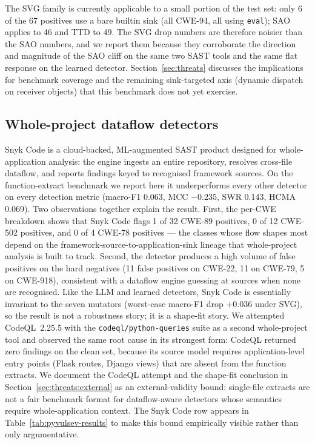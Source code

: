 The SVG family is currently applicable to a small portion of the
test set: only 6 of the 67 positives use a bare builtin sink (all
CWE-94, all using \texttt{eval}); SAO applies to 46 and TTD to 49.
The SVG drop numbers are therefore noisier than the SAO numbers,
and we report them because they corroborate the direction and
magnitude of the SAO cliff on the same two SAST tools and the same
flat response on the learned detector. Section~\ref{sec:threats}
discusses the implications for benchmark coverage and the remaining
sink-targeted axis (dynamic dispatch on receiver objects) that this
benchmark does not yet exercise.

\subsection{Whole-project dataflow detectors}
\label{sec:eval:wholeproject}

Snyk Code is a cloud-backed, ML-augmented SAST product designed for
whole-application analysis: the engine ingests an entire repository,
resolves cross-file dataflow, and reports findings keyed to recognised
framework sources. On the function-extract benchmark we report here it
underperforms every other detector on every detection metric (macro-F1
0.063, MCC $-0.235$, SWR 0.143, HCMA 0.069). Two observations together
explain the result. First, the per-CWE breakdown shows that Snyk Code
flags 1 of 32 CWE-89 positives, 0 of 12 CWE-502 positives, and 0 of 4
CWE-78 positives — the classes whose flow shapes most depend on the
framework-source-to-application-sink lineage that whole-project
analysis is built to track. Second, the detector produces a high
volume of false positives on the hard negatives (11 false positives on
CWE-22, 11 on CWE-79, 5 on CWE-918), consistent with a dataflow engine
guessing at sources when none are recognised. Like the LLM and learned
detectors, Snyk Code is essentially invariant to the seven mutators
(worst-case macro-F1 drop $+0.036$ under SVG), so the result is not a
robustness story; it is a shape-fit story. We attempted CodeQL~2.25.5
with the \texttt{codeql/python-queries} suite as a second whole-project
tool and observed the same root cause in its strongest form: CodeQL
returned zero findings on the clean set, because its source model
requires application-level entry points (Flask routes, Django views)
that are absent from the function extracts. We document the CodeQL
attempt and the shape-fit conclusion in
Section~\ref{sec:threats:external} as an external-validity bound:
single-file extracts are not a fair benchmark format for
dataflow-aware detectors whose semantics require whole-application
context. The Snyk Code row appears in Table~\ref{tab:pyvulsev-results}
to make this bound empirically visible rather than only argumentative.

